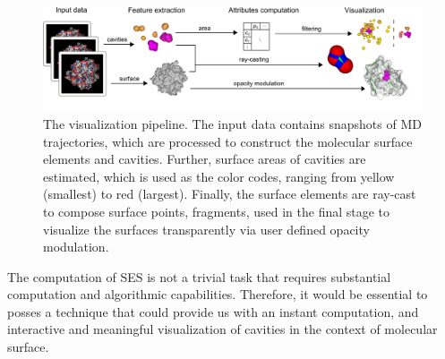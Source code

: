 \begin{figure}[tb]
  \centering
  \includegraphics[width=\textwidth]{image/overview.png}
  \caption{The visualization pipeline. The input data contains snapshots of MD trajectories, which are processed to construct the molecular surface elements and cavities. Further, surface areas of cavities are estimated, which is used as the color codes, ranging from yellow (smallest) to red (largest). Finally, the surface elements are ray-cast to compose surface points, fragments, used in the final stage to visualize the surfaces transparently via user defined opacity modulation.}
	\label{fig:overview}
\end{figure}

The computation of SES is not a trivial task that requires substantial computation and algorithmic capabilities. 
Therefore, it would be essential to posses a technique that could provide us with an instant computation, and interactive and meaningful visualization of cavities in the context of molecular surface.


